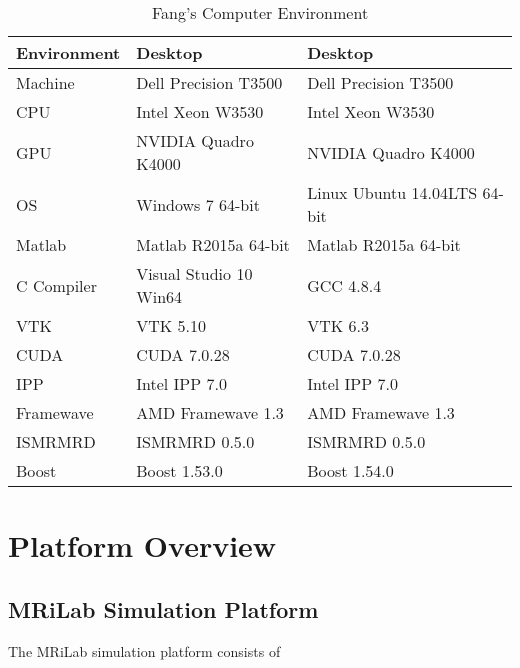 \documentclass{book}%
\begin{document}
\begin{table}[htbp]
	\centering
		\begin{tabular}{l l l}
	    \hline\hline
			Environment & Desktop & Desktop \\
			\hline
			Machine & Dell Precision T3500 & Dell Precision T3500 \\
			CPU & Intel Xeon W3530 & Intel Xeon W3530 \\
			GPU & NVIDIA Quadro K4000 & NVIDIA Quadro K4000 \\
			OS  & Windows 7 64-bit & Linux Ubuntu 14.04LTS 64-bit \\
			Matlab & Matlab R2015a 64-bit & Matlab R2015a 64-bit \\
			C Compiler & Visual Studio 10 Win64 & GCC 4.8.4 \\
			VTK & VTK 5.10 & VTK 6.3 \\
			CUDA & CUDA 7.0.28 & CUDA 7.0.28 \\
			IPP & Intel IPP 7.0 & Intel IPP 7.0 \\
			Framewave & AMD Framewave 1.3 & AMD Framewave 1.3 \\
			ISMRMRD & ISMRMRD 0.5.0 & ISMRMRD 0.5.0 \\
			Boost & Boost 1.53.0 & Boost 1.54.0 \\
			\hline
		\end{tabular}
	\caption{Fang's Computer Environment}
	\label{tab:FangSComputerEnvironment}
\end{table}


\chapter{Platform Overview}
\section{MRiLab Simulation Platform}
The MRiLab simulation platform consists of 
\end{document}
